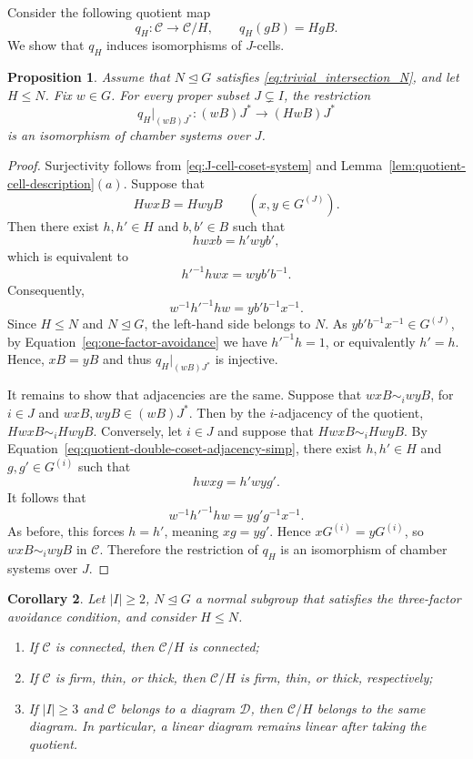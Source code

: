 \documentclass[11pt,letterpaper]{amsart}
\newtheorem{prop}{Proposition}[section]
\newtheorem{coro}[prop]{Corollary}
\newcommand{\DD}{\mathcal{D}}
\newcommand{\CC}{\mathcal{C}}
\newcounter{hw}
\begin{document}
Consider the following quotient map 
\[
    q_H\colon\CC\longrightarrow\CC/H,
    \qquad q_H(gB)=HgB.
\]
We show that $q_H$ induces isomorphisms of $J$-cells.
\begin{prop}
\label{prop:correspondenceResidues}
Assume that $N\trianglelefteq G$ satisfies
\eqref{eq:trivial_intersection_N}, and let $H\leq N$.  Fix $w\in G$.  For every
proper subset $J\subsetneq I$, the restriction
\begin{equation*}
    q_H\big|_{(wB)J^*}\colon (wB)J^*\longrightarrow(HwB)J^*
\end{equation*}
is an isomorphism of chamber systems over $J$.
\end{prop}

\begin{proof}
Surjectivity follows from \eqref{eq:J-cell-coset-system} and Lemma~\ref{lem:quotient-cell-description}$(a)$.  Suppose that
\[
    HwxB=HwyB
    \qquad(x,y\in G^{(J)}).
\]
Then there exist $h,h'\in H$ and $b,b'\in B$ such that
\[
    hwxb=h'wyb',
\]
which is equivalent to
\[
 h'^{-1}hwx=wyb'b^{-1}.
\]
Consequently,
\[
w^{-1}h'^{-1}hw=yb'b^{-1} x^{-1}.
\]
Since $H\leq N$ and $N\trianglelefteq G$, the left-hand side belongs to $N$. As $yb'b^{-1}x^{-1}\in G^{(J)}$, by
Equation~\eqref{eq:one-factor-avoidance} we have $h'^{-1}h=1$, or equivalently $h'=h$. Hence,
$xB=yB$ and thus $q_H\big|_{(wB)J^*}$ is injective.

It remains to show that adjacencies are the same. 
Suppose that $wxB\sim_i wyB$, for $i\in J$ and $wxB,wyB\in (wB)J^*$. Then by the $i$-adjacency of the quotient, $HwxB\sim_i HwyB$.
Conversely, let $i\in J$ and
suppose that $HwxB\sim_i HwyB$.  By
Equation~\eqref{eq:quotient-double-coset-adjacency-simp}, there exist $h,h'\in H$ and
$g,g'\in G^{(i)}$ such that
\[
    hwxg=h'wyg'.
\]
It follows that
\[
w^{-1}h'^{-1}hw=yg'g^{-1}x^{-1}.
\]
As before, this forces $h=h'$, meaning $xg = yg'$.  Hence
$xG^{(i)}=yG^{(i)}$, so $wxB\sim_i wyB$ in $\CC$.  Therefore the restriction
of $q_H$ is an isomorphism of chamber systems over $J$.
\end{proof}

\begin{coro}
\label{cor:quot_transfer_thin_thick_linearity}
Let $|I|\geq2$, $N\trianglelefteq G$ a normal subgroup that satisfies
the three-factor avoidance condition, and consider $H\leq N$.
\begin{enumerate}
    \item If $\CC$ is connected, then $\CC/H$ is connected;
    \item If $\CC$ is firm, thin, or
thick, then $\CC/H$ is firm, thin, or thick, respectively;
    \item If $|I|\geq 3$ and $\CC$ belongs to a diagram $\DD$, then $\CC/H$ belongs to the same diagram. In particular, a linear diagram remains linear after taking the
quotient.
\end{enumerate}
\end{coro}
\end{document}
